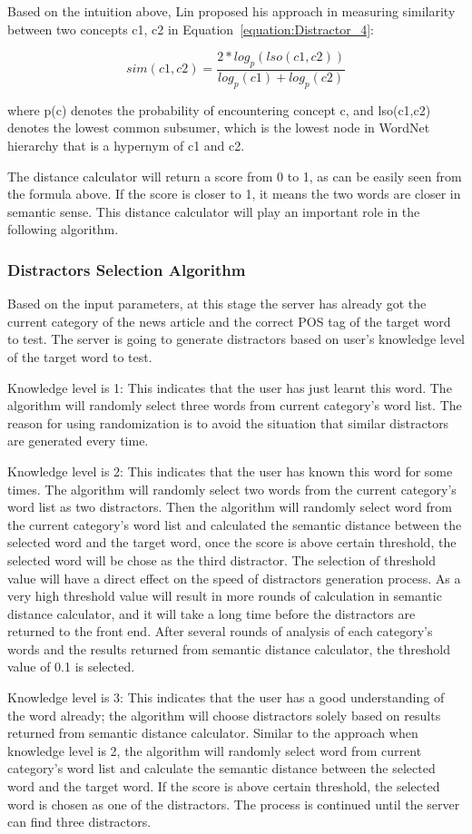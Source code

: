 Based on the intuition above, Lin proposed his approach in measuring similarity between two concepts c1, c2 in Equation~\ref{equation:Distractor_4}:

\begin{equation}
sim(c1,c2) = \frac{2*log_p(lso(c1,c2))}{log_p(c1)+log_p(c2)}
\label{equation:Distractor_4}
\end{equation}  

where p(c) denotes the probability of encountering concept c, and lso(c1,c2) denotes the lowest common subsumer, which is the lowest node in WordNet hierarchy that is a hypernym of c1 and c2. 

The distance calculator will return a score from 0 to 1, as can be easily seen from the formula above. If the score is closer to 1, it means the two words are closer in semantic sense. This distance calculator will play an important role in the following algorithm. 

\subsubsection{Distractors Selection Algorithm}
Based on the input parameters, at this stage the server has already got the current category of the news article and the correct POS tag of the target word to test. The server is going to generate distractors based on user’s knowledge level of the target word to test.

Knowledge level is 1: This indicates that the user has just learnt this word. The algorithm will randomly select three words from current category’s word list. The reason for using randomization is to avoid the situation that similar distractors are generated every time.

Knowledge level is 2: This indicates that the user has known this word for some times. The algorithm will randomly select two words from the current category’s word list as two distractors. Then the algorithm will randomly select word from the current category’s word list and calculated the semantic distance between the selected word and the target word, once the score is above certain threshold, the selected word will be chose as the third distractor. The selection of threshold value will have a direct effect on the speed of distractors generation process. As a very high threshold value will result in more rounds of calculation in semantic distance calculator, and it will take a long time before the distractors are returned to the front end. After several rounds of analysis of each category’s words and the results returned from semantic distance calculator, the threshold value of 0.1 is selected.

Knowledge level is 3: This indicates that the user has a good understanding of the word already; the algorithm will choose distractors solely based on results returned from semantic distance calculator. Similar to the approach when knowledge level is 2, the algorithm will randomly select word from current category’s word list and calculate the semantic distance between the selected word and the target word. If the score is above certain threshold, the selected word is chosen as one of the distractors. The process is continued until the server can find three distractors. 
